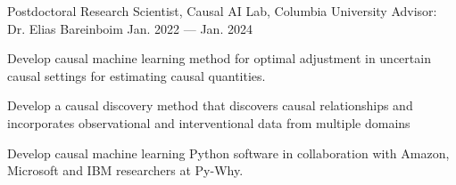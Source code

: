 

\begin{cventries}
  
    \cvproject
        {Postdoctoral Research Scientist, Causal AI Lab, Columbia University \newline Advisor: Dr. Elias Bareinboim} %
        {Jan. 2022 --- Jan. 2024} %
        {
          \begin{cvitems} %
            \item{Develop causal machine learning method for optimal adjustment in uncertain causal settings for estimating causal quantities.}
            \item{Develop a causal discovery method that discovers causal relationships and incorporates observational and interventional data from multiple domains}
            \item{Develop causal machine learning Python software in collaboration with Amazon, Microsoft and IBM researchers at Py-Why.}
          \end{cvitems}
        }
    \newline
    

\end{cventries}
